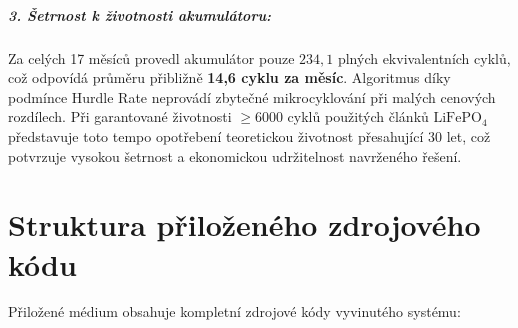 \documentclass[FM,BP]{tulthesis}
\begin{document}
	\paragraph{3. Šetrnost k životnosti akumulátoru:}
	Za celých 17 měsíců provedl akumulátor pouze $234{,}1$ plných ekvivalentních cyklů, což odpovídá průměru přibližně \textbf{14{,}6 cyklu za měsíc}. Algoritmus díky podmínce Hurdle Rate neprovádí zbytečné mikrocyklování při malých cenových rozdílech. Při garantované životnosti $\ge 6000$ cyklů použitých článků $\text{LiFePO}_4$ představuje toto tempo opotřebení teoretickou životnost přesahující 30 let, což potvrzuje vysokou šetrnost a ekonomickou udržitelnost navrženého řešení.


	\clearpage
	\printbibliography[title={Literatura}]

	\appendix
	\chapter{Struktura přiloženého zdrojového kódu}
	\label{app:struktura}

	Přiložené médium obsahuje kompletní zdrojové kódy vyvinutého systému:
\end{document}
